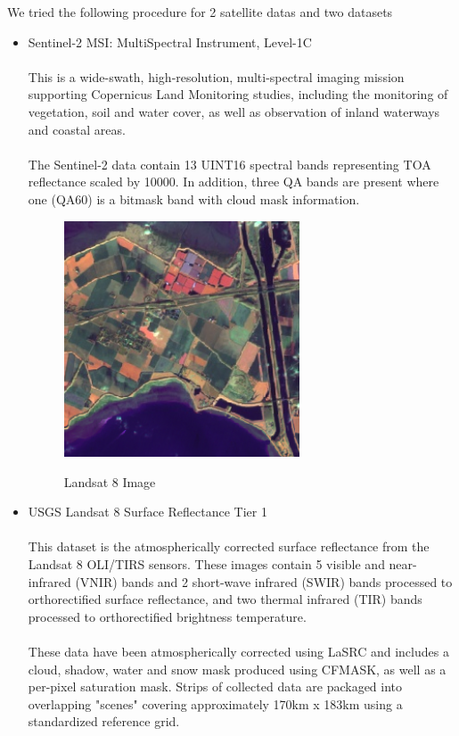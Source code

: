 \documentclass[12pt]{svproc}
\begin{document}
We tried the following procedure for 2 satellite datas and two datasets
\begin{itemize}
	\item Sentinel-2 MSI: MultiSpectral Instrument, Level-1C \\ \\This is a wide-swath, high-resolution, multi-spectral imaging mission supporting Copernicus Land Monitoring studies, including the monitoring of vegetation, soil and water cover, as well as observation of inland waterways and coastal areas.\\ \\ The Sentinel-2 data contain 13 UINT16 spectral bands representing TOA reflectance scaled by 10000. In addition, three QA bands are present where one (QA60) is a bitmask band with cloud mask information.\\
	
	\begin{figure}{}
	\includegraphics[width=0.5\linewidth, height=7cm]{p5.png} 
	\label{fig:subim1}
	\centering
	\caption{Landsat 8 Image}
    \end{figure}
	
	\item USGS Landsat 8 Surface Reflectance Tier 1 \\ \\
	This dataset is the atmospherically corrected surface reflectance from the Landsat 8 OLI/TIRS sensors. These images contain 5 visible and near-infrared (VNIR) bands and 2 short-wave infrared (SWIR) bands processed to orthorectified surface reflectance, and two thermal infrared (TIR) bands processed to orthorectified brightness temperature.\\ \\ These data have been atmospherically corrected using LaSRC and includes a cloud, shadow, water and snow mask produced using CFMASK, as well as a per-pixel saturation mask. Strips of collected data are packaged into overlapping "scenes" covering approximately 170km x 183km using a standardized reference grid.
\end{itemize}
\end{document}
